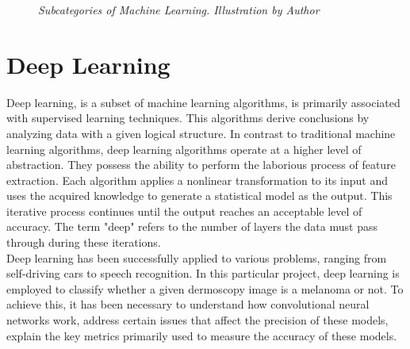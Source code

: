 \begin{figure}[H]
\centering
{}
\caption[Subcategories of Machine Learning.]{\textit{Subcategories of Machine Learning. Illustration by Author}}
{\label{fig:ml_branches}}
\end{figure}


\section{Deep Learning}

Deep learning, is a subset of machine learning algorithms, is primarily associated with supervised learning techniques. This algorithms derive conclusions by analyzing data with a given logical structure. In contrast to traditional machine learning algorithms, deep learning algorithms operate at a higher level of abstraction. They possess the ability to perform the laborious process of feature extraction. Each algorithm applies a nonlinear transformation to its input and uses the acquired knowledge to generate a statistical model as the output. This iterative process continues until the output reaches an acceptable level of accuracy. The term "deep" refers to the number of layers the data must pass through during these iterations. \\

Deep learning has been successfully applied to various problems, ranging from self-driving cars to speech recognition. In this particular project, deep learning is employed to classify whether a given dermoscopy image is a melanoma or not. To achieve this, it has been necessary to understand how convolutional neural networks work, address certain issues that affect the precision of these models, explain the key metrics primarily used to measure the accuracy of these models.


